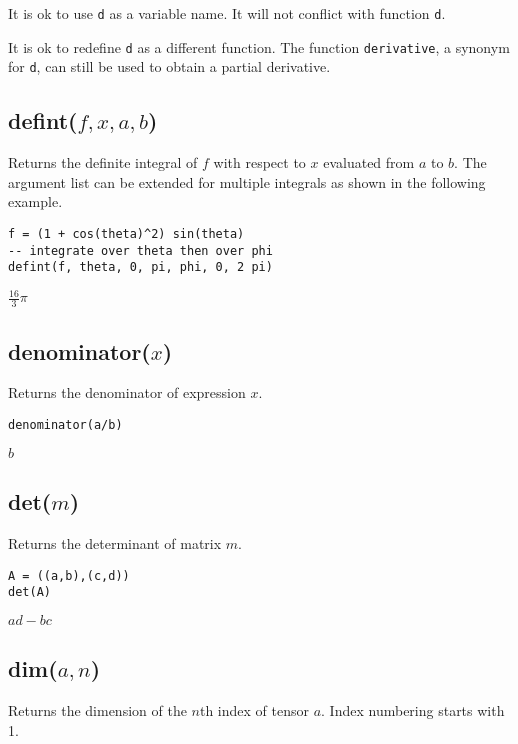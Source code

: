 \bigskip
\noindent
It is ok to use {\tt d} as a variable name.
It will not conflict with function {\tt d}.

\bigskip
\noindent
It is ok to redefine {\tt d} as a different function.
The function {\tt derivative}, a synonym for {\tt d},
can still be used to obtain a partial derivative.

\subsection*{defint($f,x,a,b$)}

Returns the definite integral of $f$ with respect to $x$
evaluated from $a$ to $b$.
The argument list can be extended for multiple integrals
as shown in the following example.

{\color{blue}
\begin{verbatim}
f = (1 + cos(theta)^2) sin(theta)
-- integrate over theta then over phi
defint(f, theta, 0, pi, phi, 0, 2 pi)
\end{verbatim}
}

\noindent
$\tfrac{16}{3}\pi$

\subsection*{denominator($x$)}

Returns the denominator of expression $x$.

{\color{blue}
\begin{verbatim}
denominator(a/b)
\end{verbatim}
}

\noindent
$b$

\subsection*{det($m$)}

Returns the determinant of matrix $m$.

{\color{blue}
\begin{verbatim}
A = ((a,b),(c,d))
det(A)
\end{verbatim}
}

\noindent
$a d - b c$

\subsection*{dim($a,n$)}

Returns the dimension of the $n$th index of tensor $a$.
Index numbering starts with 1.

